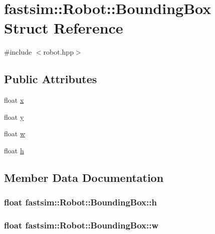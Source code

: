 \hypertarget{structfastsim_1_1_robot_1_1_bounding_box}{}\section{fastsim\+:\+:Robot\+:\+:Bounding\+Box Struct Reference}
\label{structfastsim_1_1_robot_1_1_bounding_box}


{\ttfamily \#include $<$robot.\+hpp$>$}

\subsection*{Public Attributes}
\begin{DoxyCompactItemize}
\item 
float \hyperlink{structfastsim_1_1_robot_1_1_bounding_box_a4732ef54907878a2b1d95cd25e52803f}{x}
\item 
float \hyperlink{structfastsim_1_1_robot_1_1_bounding_box_a9d249ac1802353d28129006ce6689613}{y}
\item 
float \hyperlink{structfastsim_1_1_robot_1_1_bounding_box_acc86d2455d42663f08e8344a011397cd}{w}
\item 
float \hyperlink{structfastsim_1_1_robot_1_1_bounding_box_aebd1b611fa9b8ab8d269a9c3e6486ff2}{h}
\end{DoxyCompactItemize}


\subsection{Member Data Documentation}
\subsubsection[{\texorpdfstring{h}{h}}]{\setlength{\rightskip}{0pt plus 5cm}float fastsim\+::\+Robot\+::\+Bounding\+Box\+::h}\hypertarget{structfastsim_1_1_robot_1_1_bounding_box_aebd1b611fa9b8ab8d269a9c3e6486ff2}{}\label{structfastsim_1_1_robot_1_1_bounding_box_aebd1b611fa9b8ab8d269a9c3e6486ff2}
\subsubsection[{\texorpdfstring{w}{w}}]{\setlength{\rightskip}{0pt plus 5cm}float fastsim\+::\+Robot\+::\+Bounding\+Box\+::w}\hypertarget{structfastsim_1_1_robot_1_1_bounding_box_acc86d2455d42663f08e8344a011397cd}{}\label{structfastsim_1_1_robot_1_1_bounding_box_acc86d2455d42663f08e8344a011397cd}
